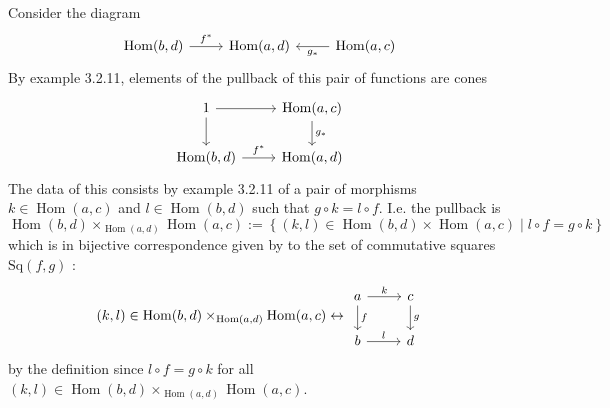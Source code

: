 \documentclass[a4paper]{article}
\DeclareMathOperator{\Hom}{Hom}
\begin{document}
Consider the diagram
\begin{equation*}
\begin{tikzcd}
    \Hom(b,d) \ar[r, "f^{*}"] & \Hom(a,d) & \ar[l, "g_*"] \Hom(a,c)
\end{tikzcd}
\end{equation*}
By example 3.2.11, elements of the pullback of this pair of functions are
cones
\begin{equation*}
\begin{tikzcd}
    1 \ar[r] \ar[d] & \Hom(a,c) \ar[d, "g_*"] \\
    \Hom(b,d) \ar[r, "f^{*}"] & \Hom(a,d)
\end{tikzcd}
\end{equation*}
The data of this consists by example 3.2.11 of a pair of morphisms
$k \in \Hom(a,c)$ and $l \in \Hom(b,d)$ such that
$g \circ k = l \circ f$. I.e. the pullback is
 \[
\Hom(b,d) \times_{\Hom(a,d)} \Hom(a,c)
:= \left\{ (k,l) \in 
\Hom(b,d) \times  \Hom(a,c)  \mid l \circ f = g \circ k \right\} 
\] 
which is in bijective correspondence given by to the set of commutative squares
$\text{Sq}(f,g)$ :
 \[
     \left( k, l \right) 
     \in \Hom(b,d) \times_{\Hom(a,d)} \Hom(a,c)
     \leftrightarrow 
     \begin{tikzcd}
         a \ar[r, "k"] \ar[d,"f"] & c \ar[d, "g"]\\
         b \ar[r, "l"] & d
     \end{tikzcd}
\] 
by the definition since $l \circ f = g \circ k$ for all
$(k,l)  
     \in \Hom(b,d) \times_{\Hom(a,d)} \Hom(a,c)$.
\end{document}
